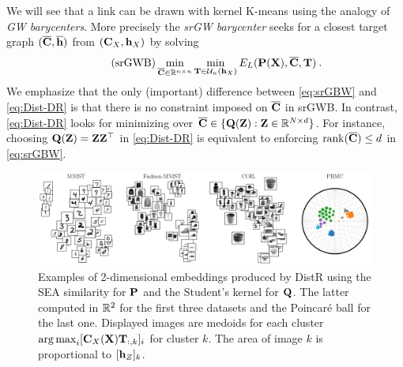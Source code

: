 We will see that a link can be drawn with kernel K-means using the analogy of \emph{GW barycenters}. More precisely the \emph{srGW barycenter} \citep{vincent2021semi} seeks for a closest target graph $(\overline{{\mathbf{C}}}, \overline{{\mathbf{h}}})$ from $({\mathbf{C}}_X, {\mathbf{h}}_X)$ by solving
\begin{equation}\tag{srGWB}\label{eq:srGBW}
	\min_{\overline{{\mathbf{C}}} \in \mathbb{R}^{n \times n}} \min_{{\mathbf{T}} \in \mathcal{U}_n({\mathbf{h}}_X)} E_L({\mathbf{P}}({\mathbf{X}}), \overline{{\mathbf{C}}}, {\mathbf{T}}) \:.
\end{equation} 
We emphasize that the only (important) difference between \cref{eq:srGBW} and
\cref{eq:Dist-DR} is that there is no constraint imposed on $\overline{{\mathbf{C}}}$ in
srGWB. In contrast, \cref{eq:Dist-DR} looks for minimizing over $\overline{{\mathbf{C}}}
\in \{{\mathbf{Q}}({\mathbf{Z}}): {\mathbf{Z}} \in \mathbb{R}^{N \times d}\}$. For instance, choosing ${\mathbf{Q}}({\mathbf{Z}}) = {\mathbf{Z}} {\mathbf{Z}}^\top$ in \cref{eq:Dist-DR} is
equivalent to enforcing $\operatorname{rank}(\overline{{\mathbf{C}}}) \leq d$ in
\cref{eq:srGBW}.
\begin{figure}[t!]
	\begin{center}
		\centerline{\includegraphics[width=\columnwidth]{figures/DistR/DistDR_embed.pdf}}
		\caption{Examples of 2-dimensional embeddings produced by DistR using the SEA similarity for ${\mathbf{P}}$ 
		and the Student's kernel for ${\mathbf{Q}}$. The latter computed in $\mathbb{R}^2$ for the first three datasets and the Poincaré ball for the last one.
		Displayed images are medoids for each cluster \ie $\operatorname*{arg\,max}_i [{\mathbf{C}}_X({\mathbf{X}}){\mathbf{T}}_{:,k}]_i$ for cluster $k$. The area of image $k$ is proportional to $[{\mathbf{h}}_Z]_k$.
		}
		\label{fig:visu_gwdr}
	\end{center}
	\vspace{-0.8cm}
\end{figure}

